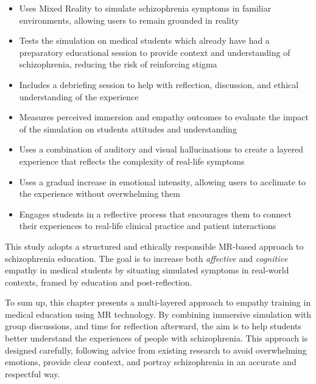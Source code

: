 \begin{itemize}
    \item Uses Mixed Reality to simulate schizophrenia symptoms in familiar environments, allowing users to remain grounded in reality
    \item Tests the simulation on medical students which already have had a preparatory educational session to provide context and understanding of schizophrenia, reducing the risk of reinforcing stigma
    \item Includes a debriefing session to help with reflection, discussion, and ethical understanding of the experience
    \item Measures perceived immersion and empathy outcomes to evaluate the impact of the simulation on students attitudes and understanding
    \item Uses a combination of auditory and visual hallucinations to create a layered experience that reflects the complexity of real-life symptoms
    \item Uses a gradual increase in emotional intensity, allowing users to acclimate to the experience without overwhelming them
    \item Engages students in a reflective process that encourages them to connect their experiences to real-life clinical practice and patient interactions
\end{itemize}

This study adopts a structured and ethically responsible MR-based approach to schizophrenia education. The goal is to increase both \textit{affective} and \textit{cognitive} empathy in medical students by situating simulated symptoms in real-world contexts, framed by education and post-reflection. 

\vspace{1em}

To sum up, this chapter presents a multi-layered approach to empathy training in medical education using MR technology. By combining immersive simulation with group discussions, and time for reflection afterward, the aim is to help students better understand the experiences of people with schizophrenia. This approach is designed carefully, following advice from existing research to avoid overwhelming emotions, provide clear context, and portray schizophrenia in an accurate and respectful way.
